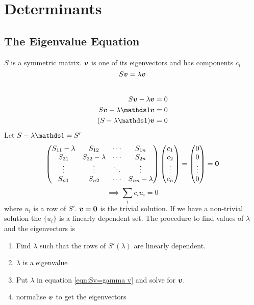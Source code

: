 \documentclass{article}
\begin{document}
    \section{Determinants}
    \subsection{The Eigenvalue Equation}
    \(S\) is a symmetric matrix.
    \(\bm{v}\) is one of its eigenvectors and has components \(c_i\)
    \begin{equation}\label{eqn:Sv=gamma v}
        S\bm{v} = \lambda\bm{v}
    \end{equation}\\[-1.5cm]
    \begin{align*}
        S\vv v - \lambda \vv v &= 0\\
        S\vv v - \lambda \ident \vv v &= 0\\
        (S - \lambda\ident)\vv v &= 0
    \end{align*}
    Let \(S - \lambda\ident = S'\)
    \[
        \begin{pmatrix}
            S_{11} - \lambda & S_{12} & \cdots & S_{1n}\\
            S_{21} & S_{22} - \lambda & \cdots & S_{2n}\\
            \vdots & \vdots & \ddots & \vdots\\
            S_{n1} & S_{n2} & \cdots & S_{nn} - \lambda
        \end{pmatrix}
        \begin{pmatrix}
            c_1 \\ c_2 \\ \vdots \\ c_n
        \end{pmatrix}
        =
        \begin{pmatrix}
            0 \\ 0 \\ \vdots \\ 0
        \end{pmatrix}
        =
        \bm{0}
    \]
    \[\implies \sum_i c_iu_i = 0\]
    where \(u_i\) is a row of \(S'\).
    \(\bm{v} = \bm{0}\) is the trivial solution. 
    If we have a non-trivial solution the \(\{u_i\}\) is a linearly dependent set.
    The procedure to find values of \(\lambda\) and the eigenvectors is
    \begin{enumerate}
        \item Find \(\lambda\) such that the rows of \(S'(\lambda)\) are linearly dependent.
        \item \(\lambda\) is a eigenvalue
        \item Put \(\lambda\) in equation \ref{eqn:Sv=gamma v} and solve for \(\bm{v}\).
        \item normalise \(\bm{v}\) to get the eigenvectors
    \end{enumerate}
    
\end{document}
